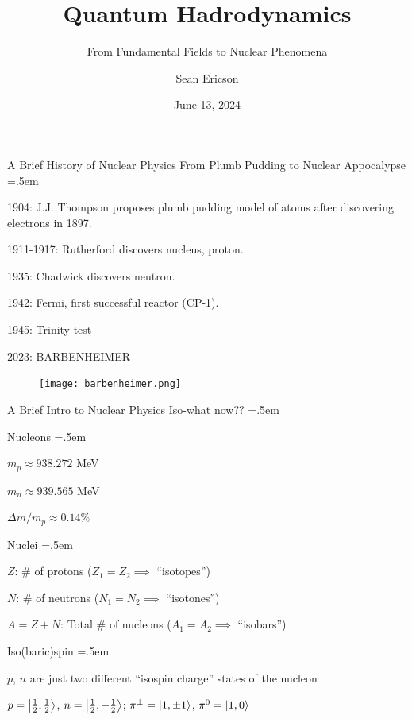 \documentclass[xcolor={dvipsnames}]{beamer}
\title{Quantum Hadrodynamics}
\subtitle{From Fundamental Fields to Nuclear Phenomena}
\author{Sean Ericson}
\institute{UO\\PHYS 663}
\date{June 13, 2024}
\let\olditemize=\itemize
\let\endolditemize=\enditemize
\renewenvironment{itemize}{\olditemize \itemsep=.5em }{\endolditemize}
\begin{document}
\frame{\titlepage}

\begin{frame}{A Brief History of Nuclear Physics}
\alert{From Plumb Pudding to Nuclear Appocalypse}
\begin{itemize}
    \item<2-> 1904: J.J. Thompson proposes plumb pudding model of atoms after discovering electrons in 1897.
    \item<3-> 1911-1917: Rutherford discovers nucleus, proton.
    \item<4-> 1935: Chadwick discovers neutron.
    \item<5-> 1942: Fermi, first successful reactor (CP-1).
    \item<6-> 1945: Trinity test
    \item<7-> 2023: BARBENHEIMER
\end{itemize}
\end{frame} 

\begin{frame}
    \begin{figure}
        \centering
        \texttt{[image: barbenheimer.png]}
    \end{figure}
\end{frame}

\begin{frame}{A Brief Intro to Nuclear Physics}
\alert{Iso-what now??}
\begin{itemize}
    \item<2-> Nucleons
    \begin{itemize}
        \item<3-> $m_p \approx 938.272$ MeV
        \item<4-> $m_n \approx 939.565$ MeV
        \item<5-> $\Delta m / m_p \approx 0.14\%$
    \end{itemize}
    \item<6-> Nuclei
    \begin{itemize}
        \item<7-> $Z$: \# of protons ($Z_1  = Z_2 \implies$ ``isotopes'')
        \item<8-> $N$: \# of neutrons ($N_1 = N_2 \implies$ ``isotones'')
        \item<9-> $A = Z + N$: Total \# of nucleons ($A_1 = A_2 \implies$ ``isobars'')
    \end{itemize}
    \item<10-> Iso(baric)spin
    \begin{itemize}
        \item<11-> $p$, $n$ are just two different ``isospin charge'' states of the nucleon
        \item<12-> $p = \ket{\frac{1}{2}, \frac{1}{2}}$, $n = \ket{\frac{1}{2}, -\frac{1}{2}}$; $\pi^\pm = \ket{1, \pm 1}$, $\pi^0 = \ket{1, 0}$
    \end{itemize}
\end{itemize}
\end{frame}
\end{document}

